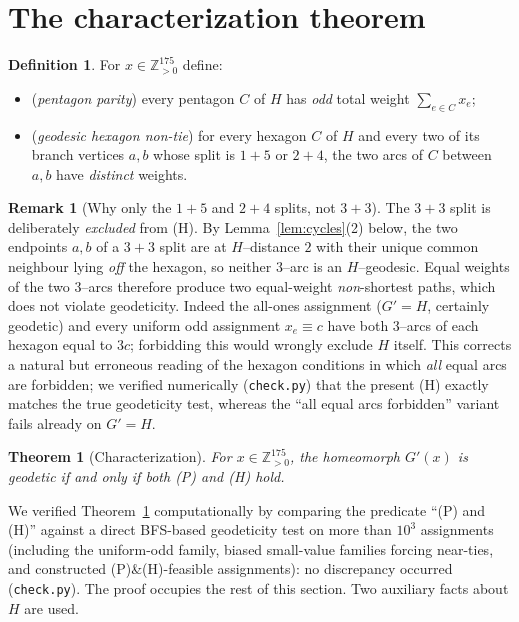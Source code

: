 \documentclass{amsart}
\newtheorem{theorem}{Theorem}
\theoremstyle{definition}
\newtheorem{definition}{Definition}
\newtheorem{remark}{Remark}
\begin{document}
\section{The characterization theorem}

\begin{definition}\label{def:conditions}
For $x\in\mathbb Z_{>0}^{175}$ define:
\begin{itemize}
\item[\textnormal{(P)}] (\emph{pentagon parity}) every pentagon $C$ of $H$ has
\emph{odd} total weight $\sum_{e\in C}x_e$;
\item[\textnormal{(H)}] (\emph{geodesic hexagon non-tie}) for every hexagon $C$
of $H$ and every two of its branch vertices $a,b$ whose split is $1{+}5$ or
$2{+}4$, the two arcs of $C$ between $a,b$ have \emph{distinct} weights.
\end{itemize}
\end{definition}

\begin{remark}[Why only the $1{+}5$ and $2{+}4$ splits, not $3{+}3$]
\label{rem:why33excluded}
The $3{+}3$ split is deliberately \emph{excluded} from (H). By
Lemma~\ref{lem:cycles}(2) below, the two endpoints $a,b$ of a $3{+}3$ split are
at $H$--distance $2$ with their unique common neighbour lying \emph{off} the
hexagon, so neither $3$--arc is an $H$--geodesic. Equal weights of the two
$3$--arcs therefore produce two equal-weight \emph{non}-shortest paths, which
does not violate geodeticity. Indeed the all-ones assignment ($G'=H$, certainly
geodetic) and every uniform odd assignment $x_e\equiv c$ have both $3$--arcs of
each hexagon equal to $3c$; forbidding this would wrongly exclude $H$ itself.
This corrects a natural but erroneous reading of the hexagon conditions in which
\emph{all} equal arcs are forbidden; we verified numerically (\texttt{check.py})
that the present (H) exactly matches the true geodeticity test, whereas the
``all equal arcs forbidden'' variant fails already on $G'=H$.
\end{remark}

\begin{theorem}[Characterization]\label{thm:main}
For $x\in\mathbb Z_{>0}^{175}$, the homeomorph $G'(x)$ is geodetic if and only
if both \textnormal{(P)} and \textnormal{(H)} hold.
\end{theorem}

We verified Theorem~\ref{thm:main} computationally by comparing the predicate
``(P) and (H)'' against a direct BFS-based geodeticity test on more than
$10^3$ assignments (including the uniform-odd family, biased small-value
families forcing near-ties, and constructed (P)\&(H)-feasible assignments): no
discrepancy occurred (\texttt{check.py}). The proof occupies the rest of this
section. Two auxiliary facts about $H$ are used.
\end{document}
